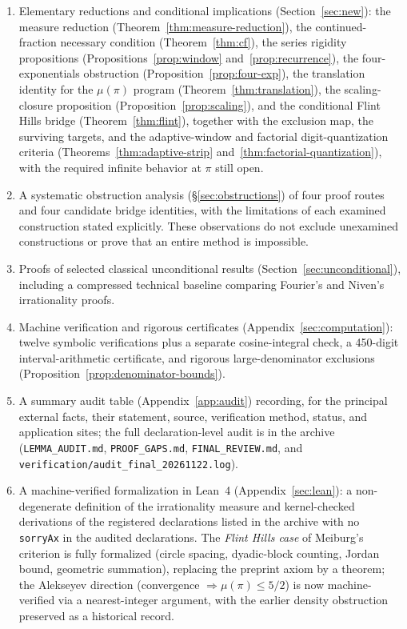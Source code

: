 \documentclass[11pt]{amsart}
\theoremstyle{definition}
\theoremstyle{remark}
\numberwithin{equation}{section}
\newcommand{\irr}{\mu}
\begin{document}
\begin{enumerate}
the admissible trace lattice and the leading common count.
\item Elementary reductions and conditional implications (Section~\ref{sec:new}): the measure reduction (Theorem~\ref{thm:measure-reduction}), the continued-fraction necessary condition (Theorem~\ref{thm:cf}), the series rigidity propositions (Propositions~\ref{prop:window} and~\ref{prop:recurrence}), the four-exponentials obstruction (Proposition~\ref{prop:four-exp}), the translation identity for the $\irr(\pi)$ program (Theorem~\ref{thm:translation}), the scaling-closure proposition (Proposition~\ref{prop:scaling}), and the conditional Flint Hills bridge (Theorem~\ref{thm:flint}), together with the exclusion map, the surviving targets, and the adaptive-window and factorial digit-quantization criteria (Theorems~\ref{thm:adaptive-strip} and~\ref{thm:factorial-quantization}), with the required infinite behavior at $\pi$ still open.
\item A systematic obstruction analysis (\S\ref{sec:obstructions}) of four proof routes and four candidate bridge identities, with the limitations of each examined construction stated explicitly. These observations do not exclude unexamined constructions or prove that an entire method is impossible.
\item Proofs of selected classical unconditional results (Section~\ref{sec:unconditional}), including a compressed technical baseline comparing Fourier's and Niven's irrationality proofs.
\item Machine verification and rigorous certificates (Appendix~\ref{sec:computation}): twelve symbolic verifications plus a separate cosine-integral check, a 450-digit interval-arithmetic certificate, and rigorous large-denominator exclusions (Proposition~\ref{prop:denominator-bounds}).
\item A summary audit table (Appendix~\ref{app:audit}) recording, for the principal external facts, their statement, source, verification method, status, and application sites; the full declaration-level audit is in the archive (\texttt{LEMMA\_AUDIT.md}, \texttt{PROOF\_GAPS.md}, \texttt{FINAL\_REVIEW.md}, and \texttt{verification/\allowbreak audit\_\allowbreak final\_\allowbreak 20261122.log}).
\item A machine-verified formalization in Lean~4 (Appendix~\ref{sec:lean}): a non-degenerate definition of the irrationality measure and kernel-checked derivations of the registered declarations listed in the archive with no \texttt{sorryAx} in the audited declarations. The \emph{Flint Hills case} of Meiburg's criterion is fully formalized (circle spacing, dyadic-block counting, Jordan bound, geometric summation), replacing the preprint axiom by a theorem; the Alekseyev direction (convergence $\Rightarrow\irr(\pi)\le5/2$) is now machine-verified via a nearest-integer argument, with the earlier density obstruction preserved as a historical record.

\end{enumerate}
\end{document}
